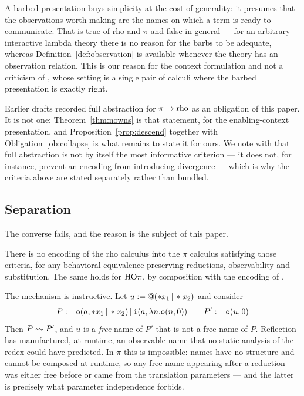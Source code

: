 \documentclass{article}
\begin{document}
\begin{remark}
    A barbed presentation buys simplicity at the cost of generality: it presumes that the observations worth making are the names on which a term is ready to communicate. That is true of rho and $\pi$ and false in general --- for an arbitrary interactive lambda theory there is no reason for the barbs to be adequate, whereas Definition~\ref{def:observation} is available whenever the theory has an observation relation. This is our reason for the context formulation and not a criticism of \citet{lybech}, whose setting is a single pair of calculi where the barbed presentation is exactly right.
\end{remark}

\begin{remark}
    Earlier drafts recorded full abstraction for $\pi\to\mathrm{rho}$ as an obligation of this paper. It is not one: Theorem~\ref{thm:nowns} is that statement, for the enabling-context presentation, and Proposition~\ref{prop:descend} together with Obligation~\ref{ob:collapse} is what remains to state it for ours. We note with \citet{gorla-nestmann} that full abstraction is not by itself the most informative criterion --- it does not, for instance, prevent an encoding from introducing divergence --- which is why the criteria above are stated separately rather than bundled.
\end{remark}

\subsection{Separation}
\label{sec:sep}

The converse fails, and the reason is the subject of this paper.

\begin{theorem}
\label{thm:sep}
    There is no encoding of the rho calculus into the $\pi$ calculus satisfying those criteria, for any behavioral equivalence preserving reductions, observability and substitution. The same holds for $\mathrm{HO}\pi$, by composition with the encoding of \citet{hopi}.
\end{theorem}

The mechanism is instructive. Let $u := @(\ast x_1\,|\, \ast x_2)$ and consider
\[P := \mathtt{o}(a,\ast x_1\,|\, \ast x_2)\,|\, \mathtt{i}(a,\lambda n.\mathtt{o}(n,0))
\qquad P' := \mathtt{o}(u,0)\]
Then $P\rightsquigarrow P'$, and $u$ is a \emph{free} name of $P'$ that is not a free name of $P$. Reflection has manufactured, at runtime, an observable name that no static analysis of the redex could have predicted. In $\pi$ this is impossible: names have no structure and cannot be composed at runtime, so any free name appearing after a reduction was either free before or came from the translation parameters --- and the latter is precisely what parameter independence forbids.
\end{document}
